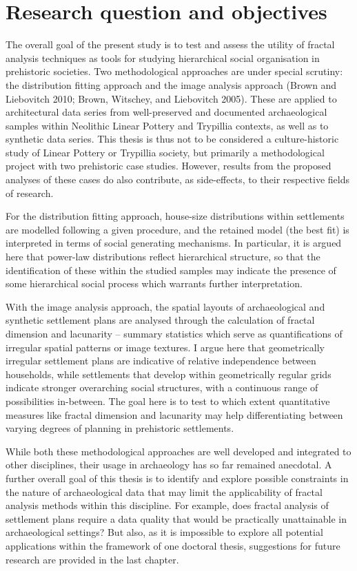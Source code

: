 \documentclass[
  12pt,
  a4paper, twoside]{book}
\begin{document}
\hypertarget{research-question-and-objectives}{%
\section{Research question and objectives}\label{research-question-and-objectives}}

The overall goal of the present study is to test and assess the utility of fractal analysis techniques as tools for studying hierarchical social organisation in prehistoric societies. Two methodological approaches are under special scrutiny: the distribution fitting approach and the image analysis approach (Brown and Liebovitch 2010; Brown, Witschey, and Liebovitch 2005). These are applied to architectural data series from well-preserved and documented archaeological samples within Neolithic Linear Pottery and Trypillia contexts, as well as to synthetic data series. This thesis is thus not to be considered a culture-historic study of Linear Pottery or Trypillia society, but primarily a methodological project with two prehistoric case studies. However, results from the proposed analyses of these cases do also contribute, as side-effects, to their respective fields of research.

For the distribution fitting approach, house-size distributions within settlements are modelled following a given procedure, and the retained model (the best fit) is interpreted in terms of social generating mechanisms. In particular, it is argued here that power-law distributions reflect hierarchical structure, so that the identification of these within the studied samples may indicate the presence of some hierarchical social process which warrants further interpretation.

With the image analysis approach, the spatial layouts of archaeological and synthetic settlement plans are analysed through the calculation of fractal dimension and lacunarity -- summary statistics which serve as quantifications of irregular spatial patterns or image textures. I argue here that geometrically irregular settlement plans are indicative of relative independence between households, while settlements that develop within geometrically regular grids indicate stronger overarching social structures, with a continuous range of possibilities in-between. The goal here is to test to which extent quantitative measures like fractal dimension and lacunarity may help differentiating between varying degrees of planning in prehistoric settlements.

While both these methodological approaches are well developed and integrated to other disciplines, their usage in archaeology has so far remained anecdotal. A further overall goal of this thesis is to identify and explore possible constraints in the nature of archaeological data that may limit the applicability of fractal analysis methods within this discipline. For example, does fractal analysis of settlement plans require a data quality that would be practically unattainable in archaeological settings? But also, as it is impossible to explore all potential applications within the framework of one doctoral thesis, suggestions for future research are provided in the last chapter.
\end{document}
